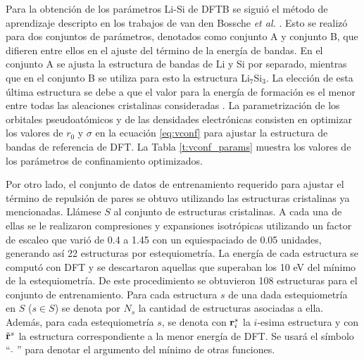 Para la obtención de los parámetros Li-Si de DFTB se siguió el 
método de aprendizaje descripto en los trabajos de van den Bossche \textit{et al.}
\cite{van2018, van2019}. Esto se realizó para dos conjuntos de parámetros, 
denotados como conjunto A y conjunto B, que difieren entre ellos en el ajuste
del término de la energía de bandas. En el conjunto A se ajusta la estructura 
de bandas de Li y Si por separado, mientras que en el conjunto B se utiliza para 
esto la estructura Li$_7$Si$_3$. La elección de esta última estructura se debe a
que el valor para la energía de formación es el menor entre todas las aleaciones
cristalinas consideradas \cite{materials_project}. La parametrización de los 
orbitales pseudoatómicos y de las densidades electrónicas consisten en optimizar 
los valores de $r_0$ y $\sigma$ en la ecuación \ref{eq:vconf} para ajustar la 
estructura de bandas de referencia de DFT. La Tabla \ref{t:vconf_params} muestra
los valores de los parámetros de confinamiento optimizados.
\begin{table}[h]
    \centering
    \caption{Parámetros del potencial de confinamiento $r_0$ y $\sigma$ para 
    los orbitales atómicos $\phi$ y las densidades $\rho^0$ de Li y Si}
    \setlength\extrarowheight{2pt}
    \label{t:vconf_params}
\end{table}

Por otro lado, el conjunto de datos de entrenamiento requerido para ajustar el 
término de repulsión de pares se obtuvo utilizando las estructuras cristalinas 
ya mencionadas. Llámese $S$ al conjunto de estructuras cristalinas. A cada una de 
ellas se le realizaron compresiones y expansiones isotrópicas utilizando un 
factor de escaleo que varió de 0.4 a 1.45 con un equiespaciado de 0.05 unidades, 
generando así 22 estructuras por estequiometría. La energía de cada estructura se 
computó con DFT y se descartaron aquellas que superaban los 10 eV del mínimo de 
la estequiometría. De este procedimiento se obtuvieron 108 estructuras para el 
conjunto de entrenamiento. Para cada estructura $s$ de una dada estequiometría 
en $S$ ($s \in S$) se denota por $N_s$ la cantidad de estructuras asociadas a 
ella. Además, para cada estequiometría $s$, se denota con ${\bf r}^s_i$ la 
$i$-esima estructura y con $\check{{\bf r}}^s$ la estructura correspondiente a la
menor energía de DFT. Se usará el símbolo ``$\ \check{\ }\ $'' para denotar 
el argumento del mínimo de otras funciones.

